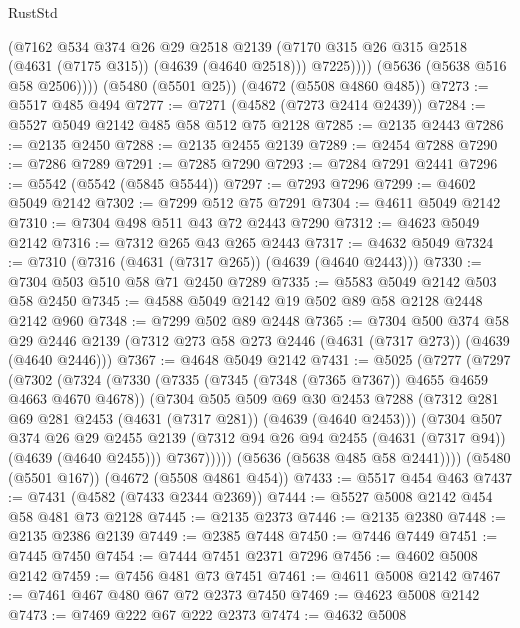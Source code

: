 \begin{lexlean}{RustStd}
\begin{coremodule}
{\begin{coremodule}
{{{{{{{{{{{{{{{{              (@7162
                @534
                @374
                @26
                @29
                @2518
                @2139
                (@7170 @315 @26 @315 @2518 (@4631 (@7175 @315)) (@4639 (@4640 @2518)))
                @7225))))
        (@5636 (@5638 @516 @58 @2506))))
    (@5480 (@5501 @25))
    (@4672 (@5508 @4860 @485))
@7273 := @5517 @485 @494
@7277 := @7271 (@4582 (@7273 @2414 @2439))
@7284 := @5527 @5049 @2142 @485 @58 @512 @75 @2128
@7285 := @2135 @2443
@7286 := @2135 @2450
@7288 := @2135 @2455 @2139
@7289 := @2454 @7288
@7290 := @7286 @7289
@7291 := @7285 @7290
@7293 := @7284 @7291 @2441
@7296 := @5542 (@5542 (@5845 @5544))
@7297 := @7293 @7296
@7299 := @4602 @5049 @2142
@7302 := @7299 @512 @75 @7291
@7304 := @4611 @5049 @2142
@7310 := @7304 @498 @511 @43 @72 @2443 @7290
@7312 := @4623 @5049 @2142
@7316 := @7312 @265 @43 @265 @2443
@7317 := @4632 @5049
@7324 := @7310 (@7316 (@4631 (@7317 @265)) (@4639 (@4640 @2443)))
@7330 := @7304 @503 @510 @58 @71 @2450 @7289
@7335 := @5583 @5049 @2142 @503 @58 @2450
@7345 := @4588 @5049 @2142 @19 @502 @89 @58 @2128 @2448 @2142 @960
@7348 := @7299 @502 @89 @2448
@7365 := @7304
    @500
    @374
    @58
    @29
    @2446
    @2139
    (@7312 @273 @58 @273 @2446 (@4631 (@7317 @273)) (@4639 (@4640 @2446)))
@7367 := @4648 @5049 @2142
@7431 := @5025
    (@7277
      (@7297
        (@7302
          (@7324
            (@7330
              (@7335 (@7345 (@7348 (@7365 @7367)) @4655 @4659 @4663 @4670 @4678))
              (@7304
                @505
                @509
                @69
                @30
                @2453
                @7288
                (@7312 @281 @69 @281 @2453 (@4631 (@7317 @281)) (@4639 (@4640 @2453)))
                (@7304
                  @507
                  @374
                  @26
                  @29
                  @2455
                  @2139
                  (@7312 @94 @26 @94 @2455 (@4631 (@7317 @94)) (@4639 (@4640 @2455)))
                  @7367)))))
        (@5636 (@5638 @485 @58 @2441))))
    (@5480 (@5501 @167))
    (@4672 (@5508 @4861 @454))
@7433 := @5517 @454 @463
@7437 := @7431 (@4582 (@7433 @2344 @2369))
@7444 := @5527 @5008 @2142 @454 @58 @481 @73 @2128
@7445 := @2135 @2373
@7446 := @2135 @2380
@7448 := @2135 @2386 @2139
@7449 := @2385 @7448
@7450 := @7446 @7449
@7451 := @7445 @7450
@7454 := @7444 @7451 @2371 @7296
@7456 := @4602 @5008 @2142
@7459 := @7456 @481 @73 @7451
@7461 := @4611 @5008 @2142
@7467 := @7461 @467 @480 @67 @72 @2373 @7450
@7469 := @4623 @5008 @2142
@7473 := @7469 @222 @67 @222 @2373
@7474 := @4632 @5008
}}}}}}}}}}}}}}}}
\end{coremodule}}
\end{coremodule}
\end{lexlean}
